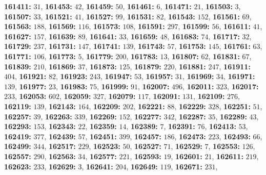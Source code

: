 \textsf{\bfseries 161411:} $31$, \textsf{\bfseries 161453:} $42$, \textsf{\bfseries 161459:} $50$, \textsf{\bfseries 161461:} $6$, \textsf{\bfseries 161471:} $21$, \textsf{\bfseries 161503:} $3$, \textsf{\bfseries 161507:} $33$, \textsf{\bfseries 161521:} $41$, \textsf{\bfseries 161527:} $99$, \textsf{\bfseries 161531:} $82$, \textsf{\bfseries 161543:} $152$, \textsf{\bfseries 161561:} $69$, \textsf{\bfseries 161563:} $188$, \textsf{\bfseries 161569:} $116$, \textsf{\bfseries 161573:} $108$, \textsf{\bfseries 161591:} $297$, \textsf{\bfseries 161599:} $56$, \textsf{\bfseries 161611:} $41$, \textsf{\bfseries 161627:} $157$, \textsf{\bfseries 161639:} $89$, \textsf{\bfseries 161641:} $33$, \textsf{\bfseries 161659:} $48$, \textsf{\bfseries 161683:} $74$, \textsf{\bfseries 161717:} $32$, \textsf{\bfseries 161729:} $237$, \textsf{\bfseries 161731:} $147$, \textsf{\bfseries 161741:} $139$, \textsf{\bfseries 161743:} $57$, \textsf{\bfseries 161753:} $145$, \textsf{\bfseries 161761:} $63$, \textsf{\bfseries 161771:} $106$, \textsf{\bfseries 161773:} $5$, \textsf{\bfseries 161779:} $200$, \textsf{\bfseries 161783:} $13$, \textsf{\bfseries 161807:} $62$, \textsf{\bfseries 161831:} $67$, \textsf{\bfseries 161839:} $210$, \textsf{\bfseries 161869:} $37$, \textsf{\bfseries 161873:} $125$, \textsf{\bfseries 161879:} $220$, \textsf{\bfseries 161881:} $247$, \textsf{\bfseries 161911:} $404$, \textsf{\bfseries 161921:} $82$, \textsf{\bfseries 161923:} $243$, \textsf{\bfseries 161947:} $53$, \textsf{\bfseries 161957:} $31$, \textsf{\bfseries 161969:} $34$, \textsf{\bfseries 161971:} $139$, \textsf{\bfseries 161977:} $23$, \textsf{\bfseries 161983:} $75$, \textsf{\bfseries 161999:} $91$, \textsf{\bfseries 162007:} $496$, \textsf{\bfseries 162011:} $323$, \textsf{\bfseries 162017:} $233$, \textsf{\bfseries 162053:} $602$, \textsf{\bfseries 162059:} $327$, \textsf{\bfseries 162079:} $117$, \textsf{\bfseries 162091:} $131$, \textsf{\bfseries 162109:} $276$, \textsf{\bfseries 162119:} $139$, \textsf{\bfseries 162143:} $164$, \textsf{\bfseries 162209:} $202$, \textsf{\bfseries 162221:} $88$, \textsf{\bfseries 162229:} $328$, \textsf{\bfseries 162251:} $51$, \textsf{\bfseries 162257:} $39$, \textsf{\bfseries 162263:} $339$, \textsf{\bfseries 162269:} $152$, \textsf{\bfseries 162277:} $342$, \textsf{\bfseries 162287:} $35$, \textsf{\bfseries 162289:} $43$, \textsf{\bfseries 162293:} $153$, \textsf{\bfseries 162343:} $22$, \textsf{\bfseries 162359:} $14$, \textsf{\bfseries 162389:} $7$, \textsf{\bfseries 162391:} $76$, \textsf{\bfseries 162413:} $53$, \textsf{\bfseries 162419:} $377$, \textsf{\bfseries 162439:} $57$, \textsf{\bfseries 162451:} $399$, \textsf{\bfseries 162457:} $186$, \textsf{\bfseries 162473:} $223$, \textsf{\bfseries 162493:} $66$, \textsf{\bfseries 162499:} $344$, \textsf{\bfseries 162517:} $229$, \textsf{\bfseries 162523:} $50$, \textsf{\bfseries 162527:} $71$, \textsf{\bfseries 162529:} $7$, \textsf{\bfseries 162553:} $126$, \textsf{\bfseries 162557:} $290$, \textsf{\bfseries 162563:} $34$, \textsf{\bfseries 162577:} $221$, \textsf{\bfseries 162593:} $19$, \textsf{\bfseries 162601:} $21$, \textsf{\bfseries 162611:} $219$, \textsf{\bfseries 162623:} $233$, \textsf{\bfseries 162629:} $3$, \textsf{\bfseries 162641:} $204$, \textsf{\bfseries 162649:} $119$, \textsf{\bfseries 162671:} $231$, 
